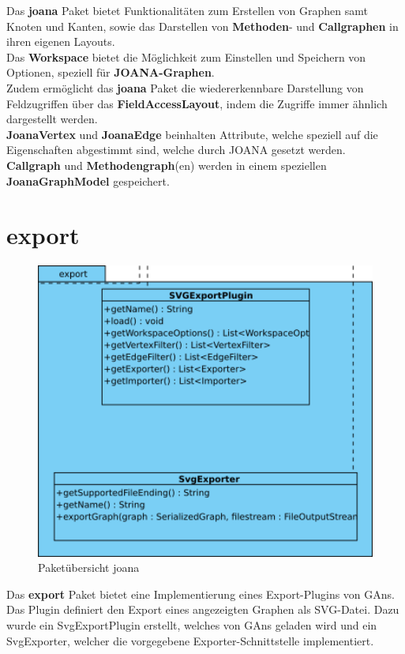 Das \textbf{joana} Paket bietet Funktionalitäten zum Erstellen von Graphen samt Knoten und Kanten, sowie das Darstellen von \textbf{Methoden}- und \textbf{Callgraphen} in ihren eigenen Layouts.\\
Das \textbf{Workspace} bietet die Möglichkeit zum Einstellen und Speichern von Optionen, speziell für \textbf{JOANA-Graphen}.\\
Zudem ermöglicht das \textbf{joana} Paket die wiedererkennbare Darstellung von Feldzugriffen über das \textbf{FieldAccessLayout}, indem die Zugriffe immer ähnlich dargestellt werden.\\
\textbf{JoanaVertex} und \textbf{JoanaEdge} beinhalten Attribute, welche speziell auf die Eigenschaften abgestimmt sind, welche durch JOANA gesetzt werden.\\
\textbf{Callgraph} und \textbf{Methodengraph}(en) werden in einem speziellen \textbf{JoanaGraphModel} gespeichert.

\section{export}

\begin{figure}[hb]
	\centering
	\includegraphics[width=380pt]{resourcen/export.png}
	\caption{Paketübersicht joana}
	\label{fig:packge_export}
\end{figure}


Das \textbf{export} Paket bietet eine Implementierung eines Export-Plugins von GAns. Das Plugin definiert den Export eines angezeigten Graphen als SVG-Datei. Dazu wurde ein SvgExportPlugin erstellt, welches von GAns geladen wird und ein SvgExporter, welcher die vorgegebene Exporter-Schnittstelle implementiert.